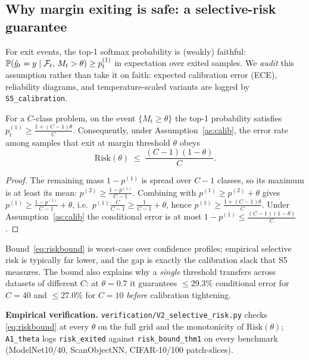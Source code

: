 \subsection{Why margin exiting is safe: a selective-risk guarantee}

\begin{assumption}\label{as:calib}
For exit events, the top-1 softmax probability is (weakly) faithful:
$\mathbb{P}(\hat y_t = y \mid \mathcal{F}_t,\, M_t>\theta) \ge p_t^{(1)}$
in expectation over exited samples. We \emph{audit} this assumption rather
than take it on faith: expected calibration error (ECE), reliability
diagrams, and temperature-scaled variants are logged by
\texttt{S5\_calibration}.
\end{assumption}

\begin{theorem}\label{thm:risk}
For a $C$-class problem, on the event $\{M_t \ge \theta\}$ the top-1
probability satisfies $p_t^{(1)} \ge \frac{1+(C-1)\theta}{C}$. Consequently,
under Assumption~\ref{as:calib}, the error rate among samples that exit at
margin threshold $\theta$ obeys
\begin{equation}
  \mathrm{Risk}(\theta)\;\le\;\frac{(C-1)(1-\theta)}{C}.
  \label{eq:riskbound}
\end{equation}
\end{theorem}
\begin{proof}
The remaining mass $1-p^{(1)}$ is spread over $C-1$ classes, so its maximum
is at least its mean: $p^{(2)} \ge \frac{1-p^{(1)}}{C-1}$. Combining with
$p^{(1)} \ge p^{(2)}+\theta$ gives
$p^{(1)} \ge \frac{1-p^{(1)}}{C-1}+\theta$, i.e.\
$p^{(1)}\frac{C}{C-1} \ge \frac{1}{C-1}+\theta$, hence
$p^{(1)} \ge \frac{1+(C-1)\theta}{C}$. Under Assumption~\ref{as:calib} the
conditional error is at most $1-p^{(1)} \le \frac{(C-1)(1-\theta)}{C}$.
\end{proof}

\begin{remark}
Bound~\eqref{eq:riskbound} is worst-case over confidence profiles; empirical
selective risk is typically far lower, and the gap is exactly the
calibration slack that S5 measures. The bound also explains why a
\emph{single} threshold transfers across datasets of different $C$:
at $\theta=0.7$ it guarantees $\le 29.3\%$ conditional error for $C=40$ and
$\le 27.0\%$ for $C=10$ \emph{before} calibration tightening.
\end{remark}

\noindent\textbf{Empirical verification.} \texttt{verification/V2\_selective\_risk.py}
checks \eqref{eq:riskbound} at every $\theta$ on the full grid and the
monotonicity of $\mathrm{Risk}(\theta)$; \texttt{A1\_theta} logs
\texttt{risk\_exited} against \texttt{risk\_bound\_thm1} on every benchmark
(ModelNet10/40, ScanObjectNN, CIFAR-10/100 patch-slices).

